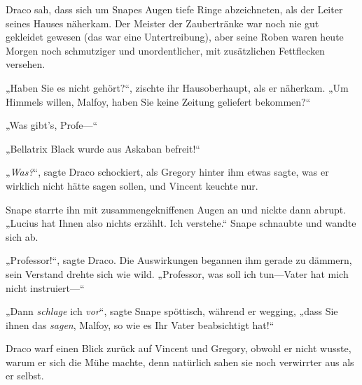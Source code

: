 Draco sah, dass sich um Snapes Augen tiefe Ringe abzeichneten, als der Leiter seines Hauses näherkam. Der Meister der Zaubertränke war noch nie gut gekleidet gewesen (das war eine Untertreibung), aber seine Roben waren heute Morgen noch schmutziger und unordentlicher, mit zusätzlichen Fettflecken versehen.

„Haben Sie es nicht gehört?“, zischte ihr Hausoberhaupt, als er näherkam. „Um Himmels willen, Malfoy, haben Sie keine Zeitung geliefert bekommen?“

„Was gibt’s, Profe—“

„Bellatrix Black wurde aus Askaban befreit!“

„\emph{Was?}“, sagte Draco schockiert, als Gregory hinter ihm etwas sagte, was er wirklich nicht hätte sagen sollen, und Vincent keuchte nur.

Snape starrte ihn mit zusammengekniffenen Augen an und nickte dann abrupt. „Lucius hat Ihnen also nichts erzählt. Ich verstehe.“ Snape schnaubte und wandte sich ab.

„Professor!“, sagte Draco. Die Auswirkungen begannen ihm gerade zu dämmern, sein Verstand drehte sich wie wild. „Professor, was soll ich tun—Vater hat mich nicht instruiert—“

„Dann \emph{schlage} ich \emph{vor}“, sagte Snape spöttisch, während er wegging, „dass Sie ihnen das \emph{sagen}, Malfoy, so wie es Ihr Vater beabsichtigt hat!“

Draco warf einen Blick zurück auf Vincent und Gregory, obwohl er nicht wusste, warum er sich die Mühe machte, denn natürlich sahen sie noch verwirrter aus als er selbst.

